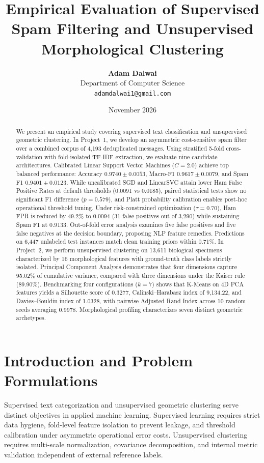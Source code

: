 \documentclass[9.5pt,twocolumn,letterpaper]{article}
\title{\vspace{-0.3in}\textbf{\Large Empirical Evaluation of Supervised Spam Filtering and Unsupervised Morphological Clustering}\vspace{-0.08in}}
\author{\textbf{Adam Dalwai} \\ Department of Computer Science \\ \texttt{adamdalwai1@gmail.com}}
\date{\vspace{-0.15in}\small November 2026\vspace{-0.1in}}
\begin{document}
\maketitle

\begin{abstract}
\noindent We present an empirical study covering supervised text classification and unsupervised geometric clustering. In Project~1, we develop an asymmetric cost-sensitive spam filter over a combined corpus of 4,193 deduplicated messages. Using stratified 5-fold cross-validation with fold-isolated TF-IDF extraction, we evaluate nine candidate architectures. Calibrated Linear Support Vector Machines ($C=2.0$) achieve top balanced performance: Accuracy $0.9740 \pm 0.0053$, Macro-F1 $0.9617 \pm 0.0079$, and Spam F1 $0.9401 \pm 0.0123$. While uncalibrated SGD and LinearSVC attain lower Ham False Positive Rates at default thresholds (0.0091 vs 0.0185), paired statistical tests show no significant F1 difference ($p=0.579$), and Platt probability calibration enables post-hoc operational threshold tuning. Under risk-constrained optimization ($\tau=0.70$), Ham FPR is reduced by 49.2\% to 0.0094 (31 false positives out of 3,290) while sustaining Spam F1 at 0.9133. Out-of-fold error analysis examines five false positives and five false negatives at the decision boundary, proposing NLP feature remedies. Predictions on 6,447 unlabeled test instances match clean training priors within 0.71\%. In Project~2, we perform unsupervised clustering on 13,611 biological specimens characterized by 16 morphological features with ground-truth class labels strictly isolated. Principal Component Analysis demonstrates that four dimensions capture 95.02\% of cumulative variance, compared with three dimensions under the Kaiser rule (89.90\%). Benchmarking four configurations ($k=7$) shows that K-Means on 4D PCA features yields a Silhouette score of 0.3277, Calinski--Harabasz index of 9,134.22, and Davies--Bouldin index of 1.0328, with pairwise Adjusted Rand Index across 10 random seeds averaging 0.9978. Morphological profiling characterizes seven distinct geometric archetypes.
\end{abstract}

\section{Introduction and Problem Formulations}
Supervised text categorization and unsupervised geometric clustering serve distinct objectives in applied machine learning. Supervised learning requires strict data hygiene, fold-level feature isolation to prevent leakage, and threshold calibration under asymmetric operational error costs. Unsupervised clustering requires multi-scale normalization, covariance decomposition, and internal metric validation independent of external reference labels.
\end{document}

